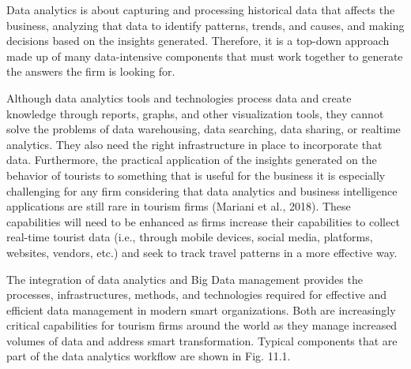 \documentclass[
  letterpaper,
  DIV=11,
  numbers=noendperiod]{scrreprt}
\begin{document}
Data analytics is about capturing and processing historical data that
affects the business, analyzing that data to identify patterns, trends,
and causes, and making decisions based on the insights generated.
Therefore, it is a top-down approach made up of many data-intensive
components that must work together to generate the answers the firm is
looking for.

Although data analytics tools and technologies process data and create
knowledge through reports, graphs, and other visualization tools, they
cannot solve the problems of data warehousing, data searching, data
sharing, or realtime analytics. They also need the right infrastructure
in place to incorporate that data. Furthermore, the practical
application of the insights generated on the behavior of tourists to
something that is useful for the business it is especially challenging
for any firm considering that data analytics and business intelligence
applications are still rare in tourism firms (Mariani et al., 2018).
These capabilities will need to be enhanced as firms increase their
capabilities to collect real-time tourist data (i.e., through mobile
devices, social media, platforms, websites, vendors, etc.) and seek to
track travel patterns in a more effective way.

The integration of data analytics and Big Data management provides the
processes, infrastructures, methods, and technologies required for
effective and efficient data management in modern smart organizations.
Both are increasingly critical capabilities for tourism firms around the
world as they manage increased volumes of data and address smart
transformation. Typical components that are part of the data analytics
workflow are shown in Fig. 11.1.
\end{document}
